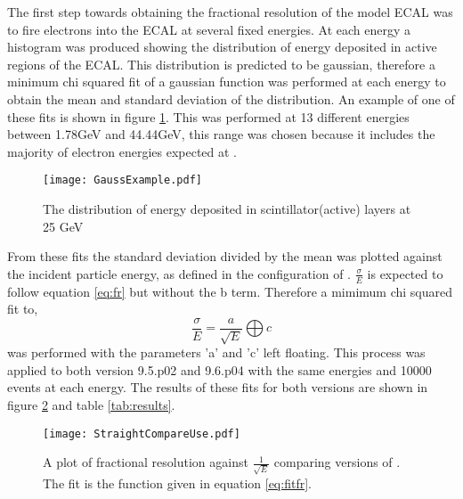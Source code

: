 The first step towards obtaining the fractional resolution of the model ECAL was to fire electrons into the ECAL at several fixed energies.  At each energy a histogram was produced showing the distribution of energy deposited in active regions of the ECAL.  This distribution is predicted to be gaussian, therefore a minimum chi squared fit of a gaussian function was performed at each energy to obtain the mean and standard deviation of the distribution. An example of one of these fits is shown in figure \ref{fig:Gauss}.  This was performed at 13 different energies between 1.78GeV and 44.44GeV, this range was chosen because it includes the majority of electron energies expected at \lhcb.

\begin{figure}[h]
  \centering
  \texttt{[image: GaussExample.pdf]}
  \caption{The distribution of energy deposited in scintillator(active) layers at 25 GeV}
  \label{fig:Gauss}
\end{figure}

From these fits the standard deviation divided by the mean was plotted against the incident particle energy, as defined in the configuration of \geant.  $\frac{\sigma}{E}$ is expected to follow equation \ref{eq:fr} but without the b term. Therefore a mimimum chi squared fit to,
\begin{equation}
  \label{eq:fitfr}
  \frac{\sigma}{E}=\frac{a}{\sqrt{E}}\bigoplus c
\end{equation}
was performed with the parameters 'a' and 'c' left floating.  This process was applied to both \geant version 9.5.p02 and 9.6.p04 with the same energies and 10000 events at each energy.  The results of these fits for both \geant versions are shown in figure \ref{fig:straightres} and table \ref{tab:results}.
\begin{figure}[h]
  \centering
  \texttt{[image: StraightCompareUse.pdf]}
  \caption{A plot of fractional resolution against $\frac{1}{\sqrt{E}}$ comparing versions of \geant. The fit is the function given in equation \ref{eq:fitfr}.}
  \label{fig:straightres}
\end{figure}


